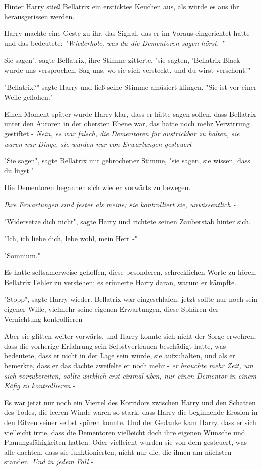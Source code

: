 {Hinter Harry stieß Bellatrix ein ersticktes Keuchen aus, als würde es aus ihr herausgerissen werden.

Harry machte eine Geste zu ihr, das Signal, das er im Voraus eingerichtet hatte und das bedeutete: \emph{"Wiederhole, was du die Dementoren sagen hörst. "}

Sie sagen", sagte Bellatrix, ihre Stimme zitterte, "sie sagten, 'Bellatrix Black wurde uns versprochen. Sag uns, wo sie sich versteckt, und du wirst verschont.'"

"Bellatrix?" sagte Harry und ließ seine Stimme amüsiert klingen. "Sie ist vor einer Weile geflohen."

Einen Moment später wurde Harry klar, dass er hätte sagen sollen, dass Bellatrix unter den Auroren in der obersten Ebene war, das hätte noch mehr Verwirrung gestiftet - \emph{Nein, es war falsch, die Dementoren für austrickbar zu halten, sie waren nur Dinge, sie wurden nur von Erwartungen gesteuert -}

"Sie sagen", sagte Bellatrix mit gebrochener Stimme, "sie sagen, sie wissen, dass du lügst."

Die Dementoren begannen sich wieder vorwärts zu bewegen.

\emph{Ihre Erwartungen sind fester als meine; sie kontrolliert sie, unwissentlich -}

"Widersetze dich nicht", sagte Harry und richtete seinen Zauberstab hinter sich.

"Ich, ich liebe dich, lebe wohl, mein Herr -"

"Somnium."

Es hatte seltsamerweise geholfen, diese besonderen, schrecklichen Worte zu hören, Bellatrix Fehler zu verstehen; es erinnerte Harry daran, warum er kämpfte.

"Stopp", sagte Harry wieder. Bellatrix war eingeschlafen; jetzt sollte nur noch sein eigener Wille, vielmehr seine eigenen Erwartungen, diese Sphären der Vernichtung kontrollieren -

Aber sie glitten weiter vorwärts, und Harry konnte sich nicht der Sorge erwehren, dass die vorherige Erfahrung sein Selbstvertrauen beschädigt hatte, was bedeutete, dass er nicht in der Lage sein würde, sie aufzuhalten, und als er bemerkte, dass er das dachte zweifelte er noch mehr - \emph{er brauchte mehr Zeit, um sich vorzubereiten, sollte wirklich erst einmal üben, nur einen Dementor in einem Käfig zu kontrollieren} -

Es war jetzt nur noch ein Viertel des Korridors zwischen Harry und den Schatten des Todes, die leeren Winde waren so stark, dass Harry die beginnende Erosion in den Ritzen seiner selbst spüren konnte. Und der Gedanke kam Harry, dass er sich vielleicht irrte, dass die Dementoren vielleicht doch ihre eigenen Wünsche und Planungsfähigkeiten hatten. Oder vielleicht wurden sie von dem gesteuert, was alle dachten, dass sie funktionierten, nicht nur die, die ihnen am nächsten standen. \emph{Und in jedem Fall} -

}
